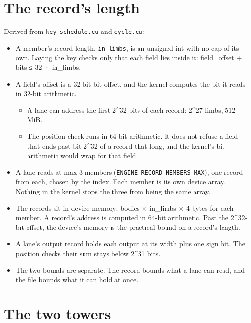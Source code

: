 \section{\texorpdfstring{The record's length}{The record's length}}

Derived from \texttt{key\_\allowbreak{}schedule.\allowbreak{}cu} and \texttt{cycle.\allowbreak{}cu}:

\begin{itemize}
\item A member's record length, \texttt{in\_\allowbreak{}limbs}, is an unsigned int with no cap of its own. Laying the key checks only that each field lies inside it: field\_\allowbreak{}offset + bits ≤ 32 · in\_\allowbreak{}limbs.
\item A field's offset is a 32-bit bit offset, and the kernel computes the bit it reads in 32-bit arithmetic.

\begin{itemize}
\item A lane can address the first 2\textasciicircum{}32 bits of each record: 2\textasciicircum{}27 limbs, 512 MiB.
\item The position check runs in 64-bit arithmetic. It does not refuse a field that ends past bit 2\textasciicircum{}32 of a record that long, and the kernel's bit arithmetic would wrap for that field.
\end{itemize}
\item A lane reads at max 3 members (\texttt{ENGINE\_\allowbreak{}RECORD\_\allowbreak{}MEMBERS\_\allowbreak{}MAX}), one record from each, chosen by the index. Each member is its own device array. Nothing in the kernel stops the three from being the same array.
\item The records sit in device memory: bodies × in\_\allowbreak{}limbs × 4 bytes for each member. A record's address is computed in 64-bit arithmetic. Past the 2\textasciicircum{}32-bit offset, the device's memory is the practical bound on a record's length.
\item A lane's output record holds each output at its width plus one sign bit. The position checks their sum stays below 2\textasciicircum{}31 bits.
\item The two bounds are separate. The record bounds what a lane can read, and the file bounds what it can hold at once.
\end{itemize}

\section{\texorpdfstring{The two towers}{The two towers}}

